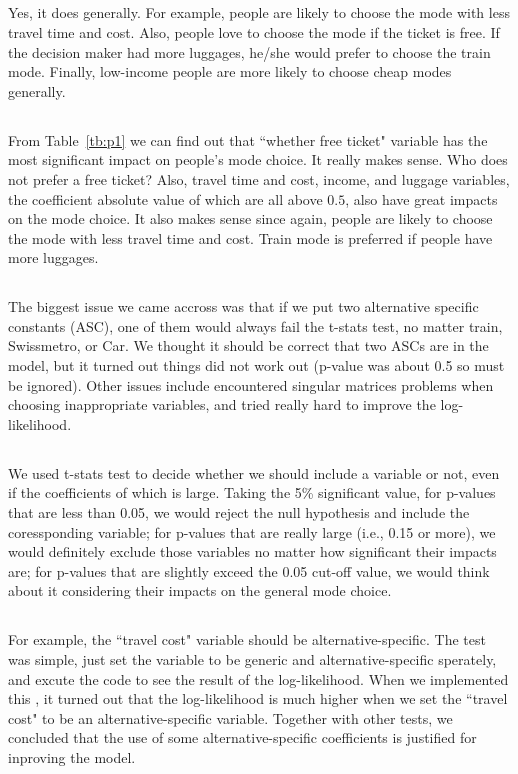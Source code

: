 \documentclass[11pt]{article}
\begin{document}
\subsection{}
Yes, it does generally. For example, people are likely to choose the mode with less travel time and cost. Also, people love to choose the mode if the ticket is free. If the decision maker had more luggages, he/she would prefer to choose the train mode. Finally, low-income people are more likely to choose cheap modes generally.
\subsection{}
From Table~\ref{tb:p1} we can find out that ``whether free ticket" variable has the most significant impact on people's mode choice. It really makes sense. Who does not prefer a free ticket? Also, travel time and cost, income, and luggage variables, the coefficient absolute value of which are all  above $0.5$, also have great impacts on the mode choice. It also makes sense since again, people are likely to choose the mode with less travel time and cost. Train mode is preferred if people have more luggages.  
\subsection{}
The biggest issue we came accross was that if we put two alternative specific constants (ASC), one of them would always fail the t-stats test, no matter train, Swissmetro, or Car. We thought it should be correct that two ASCs are in the model, but it turned out things did not work out (p-value was about 0.5 so must be ignored). Other issues include encountered singular matrices problems when choosing inappropriate variables, and tried really hard to improve the log-likelihood.  
\subsection{}
We used t-stats test to decide whether we should include a variable or not, even if the coefficients of which is large. Taking the 5\% significant value, for p-values that are less than 0.05, we would reject the null hypothesis and include the coressponding variable; for p-values that are really large (i.e., 0.15 or more), we would definitely exclude those variables no matter how significant their impacts are; for p-values that are slightly exceed the 0.05 cut-off value, we would think about it considering their impacts on the general mode choice.
\subsection{}
For example, the ``travel cost" variable should be alternative-specific. The test was simple, just set the variable to be generic and alternative-specific sperately, and excute the code to see the result of the log-likelihood. When we implemented this , it turned out that the log-likelihood is much higher when we set the ``travel cost" to be an alternative-specific variable. Together with other tests, we concluded that the use of some alternative-specific coefficients is justified for inproving the model.
\newpage
\end{document}
